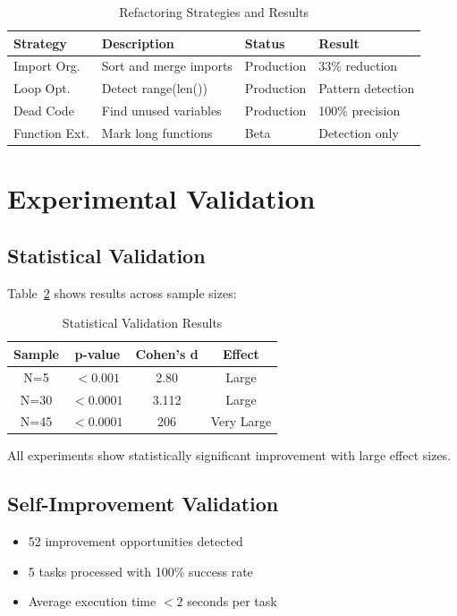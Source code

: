 \documentclass[11pt,a4paper]{article}
\begin{document}
\begin{table}[h]
\centering
\caption{Refactoring Strategies and Results}
\label{tab:refactoring}
\begin{tabular}{@{}llll@{}}
\toprule
\textbf{Strategy} & \textbf{Description} & \textbf{Status} & \textbf{Result} \\
\midrule
Import Org. & Sort and merge imports & Production & 33\% reduction \\
Loop Opt. & Detect range(len()) & Production & Pattern detection \\
Dead Code & Find unused variables & Production & 100\% precision \\
Function Ext. & Mark long functions & Beta & Detection only \\
\bottomrule
\end{tabular}
\end{table}

\section{Experimental Validation}

\subsection{Statistical Validation}

Table~\ref{tab:statistical} shows results across sample sizes:

\begin{table}[h]
\centering
\caption{Statistical Validation Results}
\label{tab:statistical}
\begin{tabular}{@{}cccc@{}}
\toprule
\textbf{Sample} & \textbf{p-value} & \textbf{Cohen's d} & \textbf{Effect} \\
\midrule
N=5 & $<0.001$ & 2.80 & Large \\
N=30 & $<0.0001$ & 3.112 & Large \\
N=45 & $<0.0001$ & 206 & Very Large \\
\bottomrule
\end{tabular}
\end{table}

All experiments show statistically significant improvement with large effect sizes.

\subsection{Self-Improvement Validation}

\begin{itemize}
    \item 52 improvement opportunities detected
    \item 5 tasks processed with 100\% success rate
    \item Average execution time $<2$ seconds per task
\end{itemize}
\end{document}

